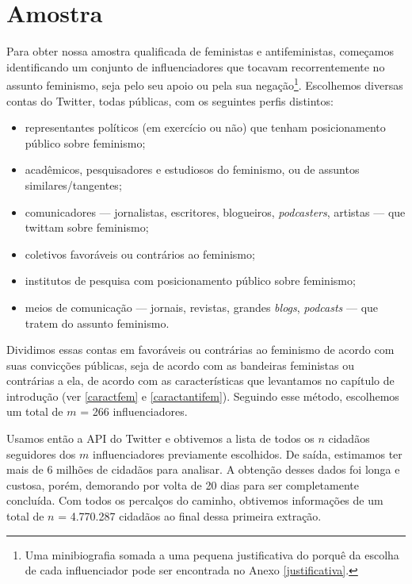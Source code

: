 \documentclass[
	12pt,				%
	openright,			%
	twoside,			%
	a4paper,			%
	english,			%
	brazil				%
	]{abntex2}
\begin{document}
 \section{Amostra}
 Para obter nossa amostra qualificada de feministas e antifeministas, começamos identificando um conjunto de influenciadores que tocavam recorrentemente no assunto feminismo, seja pelo seu apoio ou pela sua negação\footnote{Uma minibiografia somada a uma pequena justificativa do porquê da escolha de cada influenciador pode ser encontrada no Anexo \ref{justificativa}.}. Escolhemos diversas contas do Twitter, todas públicas, com os seguintes perfis distintos: 
 \begin{itemize}
 \item representantes políticos (em exercício ou não) que tenham posicionamento público sobre feminismo;
 \item acadêmicos, pesquisadores e estudiosos do feminismo, ou de assuntos similares/tangentes;
 \item comunicadores --- jornalistas, escritores, blogueiros, \emph{podcasters}, artistas --- que twittam sobre feminismo;
 \item coletivos favoráveis ou contrários ao feminismo; 
 \item institutos de pesquisa com posicionamento público sobre feminismo;
 \item meios de comunicação --- jornais, revistas, grandes \textit{blogs}, \emph{podcasts} --- que tratem do assunto feminismo. 
 \end{itemize}
 Dividimos essas contas em favoráveis ou contrárias ao feminismo de acordo com suas convicções públicas, seja de acordo com as bandeiras feministas ou contrárias a ela, de acordo com as características que levantamos no capítulo de introdução (ver \ref{caractfem} e \ref{caractantifem}). Seguindo esse método, escolhemos um total de $m$ = 266 influenciadores.

 Usamos então a API do Twitter e obtivemos a lista de todos os $n$ cidadãos seguidores dos $m$ influenciadores previamente escolhidos. De saída, estimamos ter mais de 6 milhões de cidadãos para analisar. A obtenção desses dados foi longa e custosa, porém, demorando por volta de 20 dias para ser completamente concluída. Com todos os percalços do caminho, obtivemos informações de um total de $n$ = 4.770.287 cidadãos ao final dessa primeira extração. 
\end{document}
